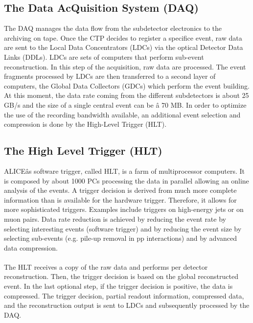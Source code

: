 \subsection{The Data AcQuisition System (DAQ)}
The DAQ manages the data flow from the subdetector electronics to the archiving on tape. Once the CTP decides to register a specifice event, raw data are sent to the Local Data Concentrators (LDCs) via the optical Detector Data Links (DDLs). LDCs are sets of computers that perform sub-event reconstruction. In this step of the acquisition, raw data are processed. The event fragments processed by LDCs are then transferred to a second layer of computers, the Global Data Collectors (GDCs) which perform the event building. At this moment, the data rate coming from the different subdetectors is about 25 GB/s and the size of a single central event can be â 70 MB. In order to optimize the use of the recording bandwidth available, an additional event selection and compression is done by the High-Level Trigger (HLT).

\subsection{The High Level Trigger (HLT)}
ALICEâs software trigger, called HLT, is a farm of multiprocessor computers. It is composed by about 1000 PCs processing the data in parallel allowing an online analysis of the events. A trigger decision is derived from much more complete information than is available for the hardware trigger. Therefore, it allows for more sophisticated triggers. Examples include triggers on high-energy jets or on muon pairs. Data rate reduction is achieved by reducing the event rate by selecting interesting events (software trigger) and by reducing the event size by selecting sub-events (e.g. pile-up removal in pp interactions) and by advanced data compression. 
\\
\\
The HLT receives a copy of the raw data and performs per detector reconstruction. Then, the trigger decision is based on the global reconstructed event. In the last optional step, if the trigger decision is positive, the data is compressed. The trigger decision, partial readout information, compressed data, and the reconstruction output is sent to LDCs and subsequently processed by the DAQ. 

